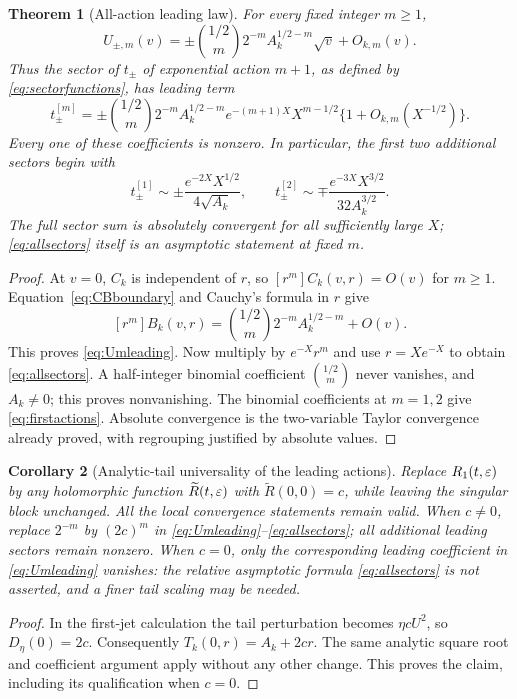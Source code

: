 \documentclass[11pt,a4paper]{article}
\numberwithin{equation}{section}
\newtheorem{theorem}{Theorem}[section]
\newtheorem{corollary}[theorem]{Corollary}
\theoremstyle{definition}\newtheorem{definition}[theorem]{Definition}
\theoremstyle{remark}\newtheorem{remark}[theorem]{Remark}
\begin{document}
\begin{theorem}[All-action leading law]\label{thm:allsectors}
For every fixed integer $m\ge1$,
\begin{equation}\label{eq:Umleading}
 U_{\pm,m}(v)=
 \pm\binom{1/2}{m}2^{-m}A_k^{1/2-m}\sqrt v+O_{k,m}(v).
\end{equation}
Thus the sector of $t_\pm$ of exponential action $m+1$, as defined by
\eqref{eq:sectorfunctions}, has leading term
\begin{equation}\label{eq:allsectors}
 t_\pm^{[m]}=
 \pm\binom{1/2}{m}2^{-m}A_k^{1/2-m}
 e^{-(m+1)X}X^{m-1/2}\{1+O_{k,m}(X^{-1/2})\}.
\end{equation}
Every one of these coefficients is nonzero. In particular, the first two
additional sectors begin with
\begin{equation}\label{eq:firstactions}
 t_\pm^{[1]}\sim\pm\frac{e^{-2X}X^{1/2}}{4\sqrt{A_k}},\qquad
 t_\pm^{[2]}\sim\mp\frac{e^{-3X}X^{3/2}}{32A_k^{3/2}}.
\end{equation}
The full sector sum is absolutely convergent for all sufficiently large
$X$; \eqref{eq:allsectors} itself is an asymptotic statement at fixed $m$.
\end{theorem}
\begin{proof}
At $v=0$, $C_k$ is independent of $r$, so
$[r^m]C_k(v,r)=O(v)$ for $m\ge1$. Equation~\eqref{eq:CBboundary} and
Cauchy's formula in $r$ give
\[
 [r^m]B_k(v,r)=
 \binom{1/2}{m}2^{-m}A_k^{1/2-m}+O(v).
\]
This proves \eqref{eq:Umleading}. Now multiply by $e^{-X}r^m$ and
use $r=Xe^{-X}$ to obtain \eqref{eq:allsectors}. A half-integer binomial
coefficient $\binom{1/2}{m}$ never vanishes, and $A_k\ne0$; this proves
nonvanishing. The binomial coefficients at $m=1,2$ give
\eqref{eq:firstactions}. Absolute convergence is the two-variable Taylor
convergence already proved, with regrouping justified by absolute values.
\end{proof}

\begin{corollary}[Analytic-tail universality of the leading actions]
\label{cor:tailuniversality}
Replace $R_1(t,\varepsilon)$ by any holomorphic function $\widetilde R(t,\varepsilon)$
with $\widetilde R(0,0)=c$, while leaving the singular block unchanged.
All the local convergence statements remain valid. When $c\ne0$,
replace $2^{-m}$ by $(2c)^m$ in
\eqref{eq:Umleading}--\eqref{eq:allsectors}; all additional leading
sectors remain nonzero. When $c=0$, only the corresponding leading
coefficient in \eqref{eq:Umleading} vanishes: the relative asymptotic
formula \eqref{eq:allsectors} is not asserted, and a finer tail scaling
may be needed.
\end{corollary}
\begin{proof}
In the first-jet calculation the tail perturbation becomes
$\eta cU^2$, so $D_\eta(0)=2c$. Consequently
$T_k(0,r)=A_k+2cr$. The same analytic square root and coefficient argument
apply without any other change. This proves the claim, including its
qualification when $c=0$.
\end{proof}
\end{document}
